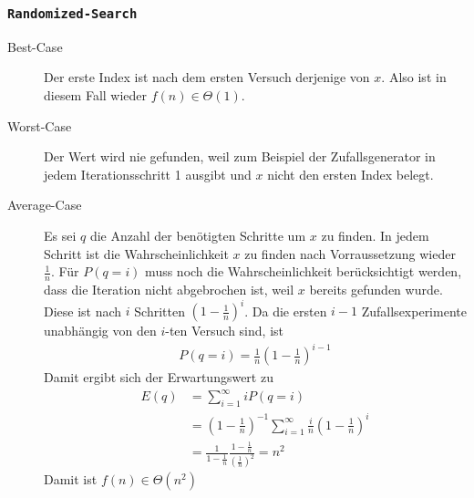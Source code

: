 \documentclass[11pt]{article}
\begin{document}
  \subsubsection*{\texttt{Randomized-Search}}
    \begin{description}
      \item[Best-Case] Der erste Index ist nach dem ersten Versuch derjenige von
        $x$. Also ist in diesem Fall wieder $f(n) \in \Theta(1)$. 

      \item[Worst-Case] Der Wert wird nie gefunden, weil zum Beispiel der
        Zufallsgenerator in jedem Iterationsschritt 1 ausgibt und 
        $x$ nicht den ersten Index belegt.

      \item[Average-Case] 
        Es sei $q$ die Anzahl der ben\"otigten Schritte um $x$ zu finden. 
        In jedem Schritt ist die Wahrscheinlichkeit $x$ zu finden nach Vorraussetzung
        wieder $\frac{1}{n}$. F\"ur $P(q=i)$ muss noch die Wahrscheinlichkeit
        ber\"ucksichtigt werden, dass die Iteration nicht abgebrochen ist, weil $x$
        bereits gefunden wurde. Diese ist nach $i$ Schritten 
        $\left( 1 - \frac{1}{n} \right)^i$. 
        Da die ersten $i-1$ Zufallsexperimente unabh\"angig von den $i$-ten
        Versuch sind, ist 
        \begin{align*}
          P(q=i)= \frac{1}{n} \left( 1 - \frac{1}{n} \right)^{ i - 1 }
        \end{align*}
        Damit ergibt sich der Erwartungswert zu
        \begin{align*}
          E(q) & = \sum_{i=1}^{\infty} i P(q=i)  \\
               & = \left( 1 - \frac{1}{n} \right)^{-1} 
          \sum_{i=1}^{\infty} \frac{i}{n} \left( 1- \frac{1}{n} \right)^i  \\
          & = \frac{1}{ 1-\frac{1}{n} } 
          \frac{1-\frac{1}{n} }{\left( \frac{1}{n} \right)^2} = n^2 
        \end{align*}
        Damit ist $f(n) \in \Theta(n^2)$
    \end{description}
\end{document}
